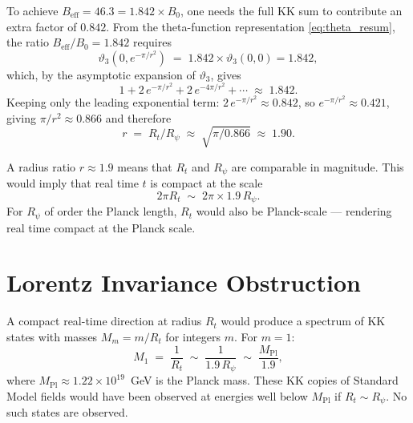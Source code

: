 \documentclass[12pt,a4paper]{article}
\theoremstyle{definition}
\theoremstyle{remark}
\begin{document}
To achieve $B_{\mathrm{eff}} = 46.3 = 1.842 \times B_0$, one needs the full
KK sum to contribute an extra factor of $0.842$.  From the theta-function
representation \eqref{eq:theta_resum}, the ratio $B_{\mathrm{eff}}/B_0 = 1.842$
requires
\begin{equation}
  \vartheta_3\!\left(0, e^{-\pi/r^2}\right) \;=\; 1.842 \times \vartheta_3(0, 0) = 1.842,
  \label{eq:theta_condition}
\end{equation}
which, by the asymptotic expansion of $\vartheta_3$, gives
\begin{equation}
  1 + 2\,e^{-\pi/r^2} + 2\,e^{-4\pi/r^2} + \cdots \;\approx\; 1.842.
\end{equation}
Keeping only the leading exponential term:
$2\,e^{-\pi/r^2} \approx 0.842$, so $e^{-\pi/r^2} \approx 0.421$, giving
$\pi/r^2 \approx 0.866$ and therefore
\begin{equation}
  r \;=\; R_t / R_\psi \;\approx\; \sqrt{\pi / 0.866} \;\approx\; 1.90.
  \label{eq:r_required}
\end{equation}

A radius ratio $r \approx 1.9$ means that $R_t$ and $R_\psi$ are comparable
in magnitude.  This would imply that real time $t$ is compact at the scale
\begin{equation}
  2\pi R_t \;\sim\; 2\pi \times 1.9\,R_\psi.
\end{equation}
For $R_\psi$ of order the Planck length, $R_t$ would also be Planck-scale ---
rendering real time compact at the Planck scale.

\section{Lorentz Invariance Obstruction}
\label{sec:lorentz}

A compact real-time direction at radius $R_t$ would produce a spectrum of
KK states with masses $M_m = m/R_t$ for integers $m$.  For $m = 1$:
\begin{equation}
  M_1 \;=\; \frac{1}{R_t} \;\sim\; \frac{1}{1.9\,R_\psi}
         \;\sim\; \frac{M_\mathrm{Pl}}{1.9},
\end{equation}
where $M_\mathrm{Pl} \approx 1.22 \times 10^{19}$~GeV is the Planck mass.
These KK copies of Standard Model fields would have been observed at energies
well below $M_\mathrm{Pl}$ if $R_t \sim R_\psi$.  No such states are observed.
\end{document}
